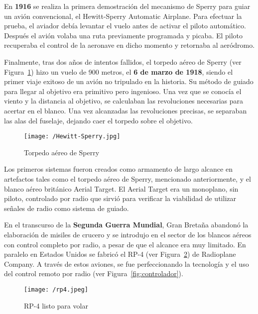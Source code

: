 En \textbf{1916} se realiza la primera demostración del mecanismo de Sperry para guiar un avión convencional, 
el Hewitt-Sperry Automatic Airplane. Para efectuar la prueba, el aviador debía levantar el vuelo antes de activar el piloto automático. Después el avión volaba una ruta previamente programada y picaba. El piloto recuperaba el control de la aeronave en dicho momento y retornaba al aeródromo.

Finalmente, tras dos años de intentos fallidos, el torpedo aéreo de Sperry (ver Figura~\ref{fig:hewittsperry}) hizo un vuelo de 900 metros, el \textbf{6 de marzo de 1918}, siendo el primer viaje exitoso de un avión no tripulado en la historia. Su método de guiado para llegar al objetivo era primitivo pero ingenioso. Una vez que se conocía el viento y la distancia al objetivo, se calculaban las revoluciones necesarias para acertar en el blanco. Una vez alcanzadas las revoluciones precisas, se separaban las alas del fuselaje, dejando caer el torpedo sobre el objetivo.

\begin{figure}[!h]
\begin{center}
\texttt{[image: /Hewitt-Sperry.jpg]}
\caption[Caption]{Torpedo aéreo de Sperry}
\label{fig:hewittsperry}
\end{center}
\end{figure}

Los primeros sistemas fueron creados como armamento de largo alcance en artefactos tales como el torpedo aéreo de Sperry, mencionado anteriormente, y el blanco aéreo británico Aerial Target. El Aerial Target era un monoplano, sin piloto, controlado por radio que sirvió para verificar la viabilidad de utilizar señales de radio como sistema de guiado.

En el transcurso de la \textbf{Segunda Guerra Mundial}, Gran Bretaña abandonó la elaboración de misiles de crucero y se introdujo en el sector de los blancos aéreos con control completo por radio, a pesar de que el alcance era muy limitado.
En paralelo en Estados Unidos se fabricó el RP-4 (ver Figura~\ref{fig:rp4}) de Radioplane Company. A través de estos aviones, se fue perfeccionando la tecnología y el uso del control remoto por radio (ver Figura~\ref{fig:controlador}).

\begin{figure}[!h]
\begin{center}
\texttt{[image: /rp4.jpeg]}
\caption[Caption]{RP-4 listo para volar}
\label{fig:rp4}
\end{center}
\end{figure}


